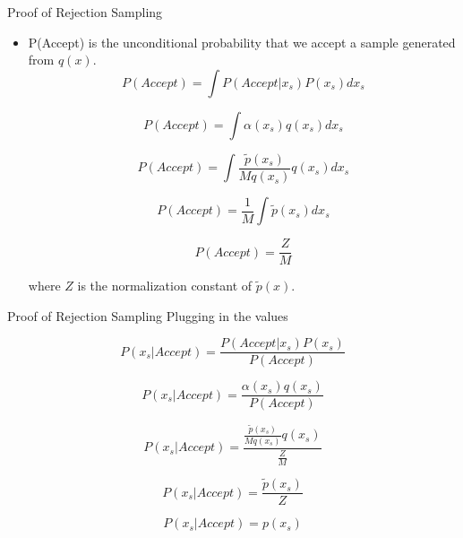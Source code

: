 \documentclass{beamer}
\begin{document}
\begin{frame}{Proof of Rejection Sampling}

\begin{itemize}
    \item  P(Accept) is the unconditional probability that we accept a sample generated from $q(x)$.
    \pause \begin{equation}
        P(Accept) = \int P(Accept|x_s) P(x_s) dx_s
    \end{equation}

    \pause \begin{equation}
        P(Accept) = \int \alpha(x_s) q(x_s) dx_s
    \end{equation}
    
    \pause \begin{equation}
        P(Accept) = \int \frac{\tilde{p}(x_s)}{M q(x_s)} q(x_s) dx_s
    \end{equation}

    \pause \begin{equation}
        P(Accept) = \frac{1}{M} \int \tilde{p}(x_s) dx_s
    \end{equation}

    \pause \begin{equation}
        P(Accept) = \frac{Z}{M}
    \end{equation}

    where $Z$ is the normalization constant of $\tilde{p}(x)$.
\end{itemize}
    
\end{frame}

\begin{frame}{Proof of Rejection Sampling}
    Plugging in the values

    \begin{equation}
        P(x_s|Accept) = \frac{P(Accept|x_s) P(x_s)}{P(Accept)}
    \end{equation}

    \pause \begin{equation}
        P(x_s|Accept) = \frac{\alpha(x_s) q(x_s)}{P(Accept)}
    \end{equation}

    \pause \begin{equation}
        P(x_s|Accept) = \frac{\frac{\tilde{p}(x_s)}{M q(x_s)} q(x_s)}{\frac{Z}{M}}
    \end{equation}

    \pause \begin{equation}
        P(x_s|Accept) = \frac{\tilde{p}(x_s)}{Z}
    \end{equation}

    \pause \begin{equation}
        P(x_s|Accept) = p(x_s)
    \end{equation}

    
\end{frame}
\end{document}
